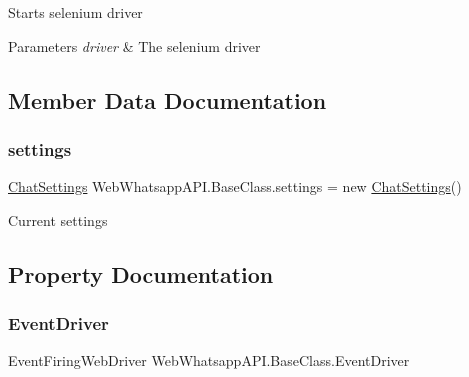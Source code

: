 Starts selenium driver 


\begin{DoxyParams}{Parameters}
{\em driver} & The selenium driver\\
\hline
\end{DoxyParams}


\subsection{Member Data Documentation}
\mbox{\label{class_web_whatsapp_a_p_i_1_1_base_class_af7b5c73d834b7c97f6aa1947310af34e}} 
\subsubsection{\texorpdfstring{settings}{settings}}
{\footnotesize\ttfamily \hyperlink{class_web_whatsapp_a_p_i_1_1_base_class_1_1_chat_settings}{Chat\+Settings} Web\+Whatsapp\+A\+P\+I.\+Base\+Class.\+settings = new \hyperlink{class_web_whatsapp_a_p_i_1_1_base_class_1_1_chat_settings}{Chat\+Settings}()}



Current settings 



\subsection{Property Documentation}
\mbox{\label{class_web_whatsapp_a_p_i_1_1_base_class_a1db62394318cea6839e32f2820fb426f}} 
\subsubsection{\texorpdfstring{Event\+Driver}{EventDriver}}
{\footnotesize\ttfamily Event\+Firing\+Web\+Driver Web\+Whatsapp\+A\+P\+I.\+Base\+Class.\+Event\+Driver\hspace{0.3cm}{\ttfamily [get]}}



